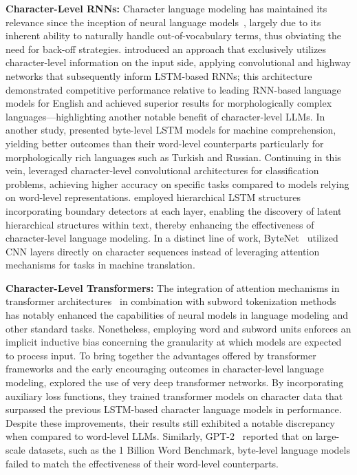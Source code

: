 \textbf{Character-Level RNNs:} Character language modeling has maintained its relevance since the inception of neural language models~\citep{sutskever2011generating,mikolov2012subword,graves2013generating}, largely due to its inherent ability to naturally handle out-of-vocabulary terms, thus obviating the need for back-off strategies. \cite{kim2016character} introduced an approach that exclusively utilizes character-level information on the input side, applying convolutional and highway networks that subsequently inform LSTM-based RNNs; this architecture demonstrated competitive performance relative to leading RNN-based language models for English and achieved superior results for morphologically complex languages—highlighting another notable benefit of character-level LLMs. In another study, \cite{kenter2018byte} presented byte-level LSTM models for machine comprehension, yielding better outcomes than their word-level counterparts particularly for morphologically rich languages such as Turkish and Russian. Continuing in this vein, \cite{zhang2015character} leveraged character-level convolutional architectures for classification problems, achieving higher accuracy on specific tasks compared to models relying on word-level representations. \citet{chung2019hierarchical} employed hierarchical LSTM structures incorporating boundary detectors at each layer, enabling the discovery of latent hierarchical structures within text, thereby enhancing the effectiveness of character-level language modeling. In a distinct line of work, ByteNet~\cite{kalchbrenner2016neural} utilized CNN layers directly on character sequences instead of leveraging attention mechanisms for tasks in machine translation.

\textbf{Character-Level Transformers:} The integration of attention mechanisms in transformer architectures~\citep{vaswani2017attention} in combination with subword tokenization methods~\citep{sennrich-etal-2016-neural} has notably enhanced the capabilities of neural models in language modeling and other standard tasks. Nonetheless, employing word and subword units enforces an implicit inductive bias concerning the granularity at which models are expected to process input. To bring together the advantages offered by transformer frameworks and the early encouraging outcomes in character-level language modeling, \citet{al2019character} explored the use of very deep transformer networks. By incorporating auxiliary loss functions, they trained transformer models on character data that surpassed the previous LSTM-based character language models in performance. Despite these improvements, their results still exhibited a notable discrepancy when compared to word-level LLMs. Similarly, GPT-2~\citep{radfordgpt2} reported that on large-scale datasets, such as the 1 Billion Word Benchmark, byte-level language models failed to match the effectiveness of their word-level counterparts.

